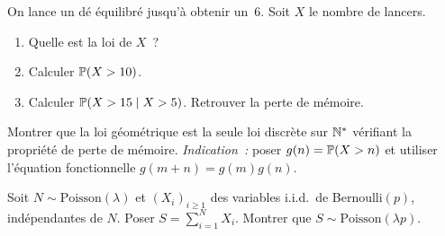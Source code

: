 \begin{exercice}
On lance un d\'e \'equilibr\'e jusqu'\`a obtenir un~6. Soit $X$ le nombre de lancers.
\begin{enumerate}[label=(\alph*)]
    \item Quelle est la loi de $X$~?
    \item Calculer $\mathbb{P}(X > 10)$.
    \item Calculer $\mathbb{P}(X > 15 \mid X > 5)$. Retrouver la perte de m\'emoire.
\end{enumerate}
\end{exercice}

\begin{exercice}
Montrer que la loi g\'eom\'etrique est la seule loi discr\`ete sur $\mathbb{N}^*$ v\'erifiant
la propri\'et\'e de perte de m\'emoire.
\textit{Indication~:} poser $g(n) = \mathbb{P}(X > n)$ et utiliser l'\'equation fonctionnelle
$g(m+n) = g(m)g(n)$.
\end{exercice}

\begin{exercice}
Soit $N \sim \text{Poisson}(\lambda)$ et $(X_i)_{i \geq 1}$ des variables i.i.d.\
de Bernoulli$(p)$, ind\'ependantes de $N$. Poser $S = \sum_{i=1}^{N} X_i$.
Montrer que $S \sim \text{Poisson}(\lambda p)$.
\end{exercice}
